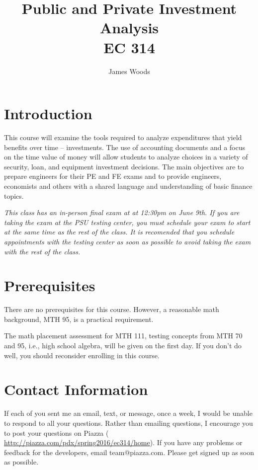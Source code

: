 \documentclass[letterpaper,10pt]{article}
\date{}
\title{Public and Private Investment Analysis\\  
EC 314\\
\Term}
\author{James Woods}
\newif\ifhybrid
\newif\ifonline
\newcommand{\Piazza}{\url{ http://piazza.com/pdx/spring2016/ec314/home}}
\newcommand{\FinalExam}{at 12:30pm  on June 9th}
\begin{document}
  
\maketitle

\section{Introduction}

This course will examine the tools required to analyze expenditures
that yield benefits over time -- investments. The use of accounting
documents and a focus on the time value of money will allow students
to analyze choices in a variety of security, loan, and equipment
investment decisions. The main objectives are to prepare engineers for their PE and FE exams and to
provide engineers, economists and others with a shared language and
understanding of basic finance topics.


\ifhybrid  \fi
\ifonline  \fi

\emph{This class has an in-person final exam at \FinalExam. If you are taking the exam at the PSU testing center, you must schedule your exam to start at the same time as the rest of the class. It is recomended that you schedule appointments with the testing center as soon as possible to avoid taking the exam with the rest of the class.}

\section{Prerequisites}

There are no prerequisites for this course. However, a reasonable math
background, MTH 95, is a practical requirement. 

\ifonline
  
  \else
    The math placement assessment for MTH 111, testing concepts from MTH 70 and 95, i.e., high school algebra, will be given on the first day.  If you don't do well, you should reconsider enrolling in this course.
\fi

\section{Contact Information}

If each of you sent me an email, text, or message, once a week, I would be unable to respond to all your questions.  Rather than emailing questions, I encourage you to post your questions on Piazza (\Piazza). If you have any problems or feedback for the developers, email team@piazza.com. Please get signed up as soon as possible. 
\end{document}
